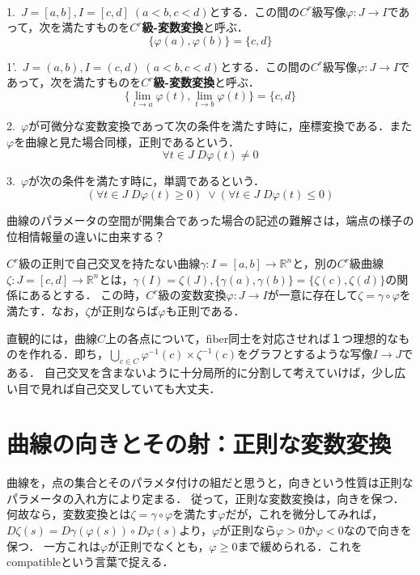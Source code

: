 \documentclass[uplatex, dvipdfmx]{jsreport}
\begin{document}
\begin{definition}\rm{}　
    
    1.\, $J=[a,b],I=[c,d]\;(a<b,c<d)$とする．この間の$C^r$級写像$\varphi:J\to I$であって，次を満たすものを\textbf{$C^r$級-変数変換}と呼ぶ．
    \[ \{\varphi(a),\varphi(b)\}=\{c,d\} \]

    1'.\, $J=(a,b),I=(c,d)\;(a<b,c<d)$とする．この間の$C^r$級写像$\varphi:J\to I$であって，次を満たすものを\textbf{$C^r$級-変数変換}と呼ぶ．
    \[ \{\lim_{t\to a}\varphi(t),\lim_{t\to b}\varphi(t)\}=\{c,d\} \]

    2.\, $\varphi$が可微分な変数変換であって次の条件を満たす時に，座標変換である．また$\varphi$を曲線と見た場合同様，正則であるという．
    \[ \forall t\in J\; D\varphi(t)\ne 0 \]

    3.\, $\varphi$が次の条件を満たす時に，単調であるという．
    \[ (\forall t\in J\; D\varphi(t)\ge 0)\;\lor (\forall t\in J\; D\varphi(t)\le 0) \]
\end{definition}
\begin{remark}
    曲線のパラメータの空間が開集合であった場合の記述の難解さは，端点の様子の位相情報量の違いに由来する？
\end{remark}


\begin{shadebox}\begin{proposition}
    $C^r$級の正則で自己交叉を持たない曲線$\gamma:I=[a,b]\to\mathbb{R}^n$と，別の$C^r$級曲線$\zeta:J=[c,d]\to\mathbb{R}^n$とは，$\gamma(I)=\zeta(J),\{\gamma(a),\gamma(b)\}=\{\zeta(c),\zeta(d)\}$の関係にあるとする．
    この時，$C^r$級の変数変換$\varphi:J\to I$が一意に存在して$\zeta=\gamma\circ\varphi$を満たす．なお，$\zeta$が正則ならば$\varphi$も正則である．
\end{proposition}\end{shadebox}
直観的には，曲線$C$上の各点について，fiber同士を対応させれば１つ理想的なものを作れる．即ち，$\bigcup_{c\in C}\varphi^{-1}(c)\times\zeta^{-1}(c)$をグラフとするような写像$I\to J$である．
自己交叉を含まないように十分局所的に分割して考えていけば，少し広い目で見れば自己交叉していても大丈夫．

\section{曲線の向きとその射：正則な変数変換}
曲線を，点の集合とそのパラメタ付けの組だと思うと，向きという性質は正則なパラメータの入れ方により定まる．
従って，正則な変数変換は，向きを保つ．
何故なら，変数変換とは$\zeta=\gamma\circ\varphi$を満たす$\varphi$だが，これを微分してみれば，
$D\zeta(s)=D\gamma(\varphi(s))\circ D\varphi(s)$より，$\varphi$が正則なら$\varphi>0$か$\varphi<0$なので向きを保つ．
一方これは$\varphi$が正則でなくとも，$\varphi\ge 0$まで緩められる．これをcompatibleという言葉で捉える．
\end{document}
